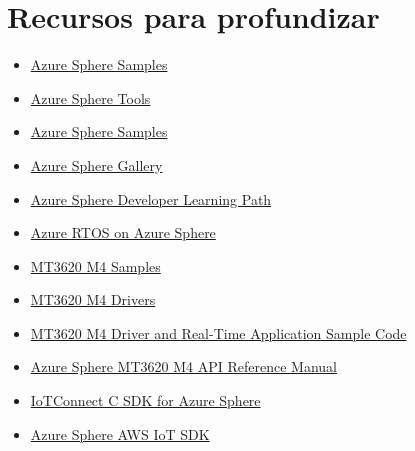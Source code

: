\section{Recursos para profundizar}
\begin{itemize}
	\item
	\href{https://github.com/Azure/azure-sphere-samples}{Azure Sphere Samples}
	\item 
	\href{https://github.com/Azure/azure-sphere-tools}{Azure Sphere Tools}
	\item 
	\href{https://github.com/Azure/azure-sphere-samples}{Azure Sphere Samples}
	\item 
	\href{https://github.com/Azure/azure-sphere-gallery}{Azure Sphere Gallery}
	\item 
	\href{https://github.com/MicrosoftDocs/Azure-Sphere-Developer-Learning-Path}{Azure Sphere Developer Learning Path}
	\item 
	\href{https://github.com/Azure-Samples/Azure-RTOS-on-Azure-Sphere-Mediatek-MT3620}{Azure RTOS on Azure Sphere}
	\item 
	\href{https://github.com/CodethinkLabs/mt3620-m4-samples/}{MT3620 M4 Samples}
	\item 
	\href{https://github.com/CodethinkLabs/mt3620-m4-drivers}{MT3620 M4 Drivers}
	\item 
	\href{https://github.com/MediaTek-Labs/mt3620_m4_software/}{MT3620 M4 Driver and Real-Time Application Sample Code}
	\item
	\href{https://support.mediatek.com/AzureSphere/mt3620/M4_API_Reference_Manual/index.html}{Azure Sphere MT3620 M4 API Reference Manual} 
	\item 
	\href{https://github.com/avnet-iotconnect/iotc-sphereos-sdk}{IoTConnect C SDK for Azure Sphere}
	\item 
	\href{https://github.com/xiongyu0523/azure-sphere-aws-iot-device-sdk-embedded-c}{Azure Sphere AWS IoT SDK}
\end{itemize}